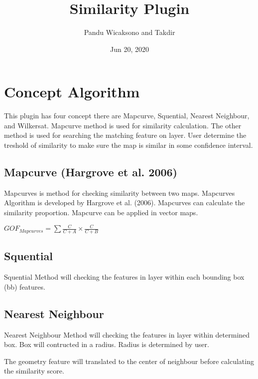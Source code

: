 \documentclass[letterpaper,10pt,english]{sphinxmanual}
\title{Similarity Plugin}
\date{Jun 20, 2020}
\author{Pandu Wicaksono and Takdir}
\let\sphinxpxdimen\pdfpxdimen\else\newdimen\sphinxpxdimen
\begin{document}
\pagestyle{empty}
\sphinxmaketitle
\pagestyle{plain}
\sphinxtableofcontents
\pagestyle{normal}
\label{\detokenize{index::doc}}



\chapter{Concept Algorithm}
\label{\detokenize{concept:concept-algorithm}}\label{\detokenize{concept::doc}}
This plugin has four concept there are Mapcurve, Squential, Nearest Neighbour, and Wilkersat. Mapcurve method is used for similarity calculation. The other method is used for searching the matching feature on layer. User determine the treshold of similarity to make sure the map is similar in some confidence interval.


\section{Mapcurve (Hargrove et al. 2006)}
\label{\detokenize{concept:mapcurve-hargrove-et-al-2006}}
Mapcurves is method for checking similarity between two maps. Mapcurves Algorithm is developed by Hargrove et al. (2006). Mapcurves can calculate the similarity proportion. Mapcurve can be applied in vector maps.

\(GOF_{Mapcurves} = \sum{\frac{C}{C+A} \times \frac{C}{C+B}}\)


\section{Squential}
\label{\detokenize{concept:squential}}
Squential Method will checking the features in layer within each bounding box (bb) features.

\noindent\sphinxincludegraphics[width=400\sphinxpxdimen]{{squential}.gif}


\section{Nearest Neighbour}
\label{\detokenize{concept:nearest-neighbour}}
Nearest Neighbour Method will checking the features in layer within determined box. Box will contructed in a radius. Radius is determined by user.

\noindent\sphinxincludegraphics[width=400\sphinxpxdimen]{{nn}.gif}

The geometry feature will translated to the center of neighbour before calculating the similarity score.
\end{document}
